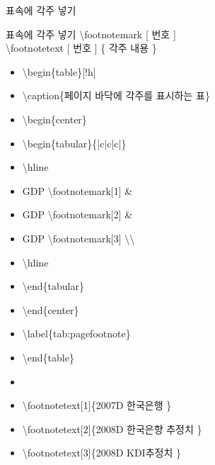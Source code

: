 \documentclass[ aspectratio=149,  10pt,blue,xcolor=pdftex,dvipsnames,table,handout,notes]{beamer}
\begin{document}
		\begin{frame}[t,shrink=0]{표속에 각주 넣기}

			\begin{block} {표속에 각주 넣기}
			\textbackslash footnotemark [ 번호 ] \\
			\textbackslash footnotetext [ 번호 ] \{ 각주 내용 \}
			\end{block}

			\begin{example}
			\begin{itemize}
				\item[]	\textbackslash begin\{table\}[!h]
				\item[]	\textbackslash caption\{페이지 바닥에 각주를 표시하는 표\}
				\item[]	\textbackslash begin\{center\}
				\item[]	\textbackslash begin\{tabular\}\{|c|c|c|\}
				\item[]	\textbackslash hline
				\item[]	GDP \textbackslash footnotemark[1] \&
				\item[]	GDP \textbackslash footnotemark[2] \&
				\item[]	GDP \textbackslash footnotemark[3] \textbackslash \textbackslash
				\item[]	\textbackslash hline
				\item[]	\textbackslash end\{tabular\}
				\item[]	\textbackslash end\{center\}
				\item[]	\textbackslash label\{tab:pagefootnote\}
				\item[]	\textbackslash end\{table\}
				\item[]	
				\item[]	\textbackslash footnotetext[1]\{2007D 한국은행 \}
				\item[]	\textbackslash footnotetext[2]\{2008D 한국은향 추정치 \}
				\item[]	\textbackslash footnotetext[3]\{2008D KDI추정치 \}
			\end{itemize}
			\end{example}

		\note[item]{}
		\note[item]{}
		\note[item]{}
		\note[item]{}
		\note[item]{}

		\end{frame}
\end{document}

